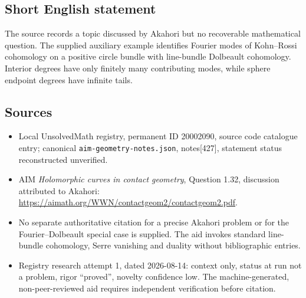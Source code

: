 \documentclass[11pt]{article}
\begin{document}
\subsection{Short English statement}
The source records a topic discussed by Akahori but no recoverable mathematical question. The supplied auxiliary example identifies Fourier modes of Kohn--Rossi cohomology on a positive circle bundle with line-bundle Dolbeault cohomology. Interior degrees have only finitely many contributing modes, while sphere endpoint degrees have infinite tails.
\subsection{Sources}
\begin{itemize}
\item Local UnsolvedMath registry, permanent ID 20002090, source code catalogue entry; canonical \texttt{aim-geometry-notes.json}, notes[427], statement status reconstructed unverified.
\item AIM \emph{Holomorphic curves in contact geometry}, Question 1.32, discussion attributed to Akahori: \url{https://aimath.org/WWN/contactgeom2/contactgeom2.pdf}.
\item No separate authoritative citation for a precise Akahori problem or for the Fourier--Dolbeault special case is supplied. The aid invokes standard line-bundle cohomology, Serre vanishing and duality without bibliographic entries.
\item Registry research attempt 1, dated 2026-08-14: context only, status at run not a problem, rigor ``proved'', novelty confidence low. The machine-generated, non-peer-reviewed aid requires independent verification before citation.
\end{itemize}
\end{document}
